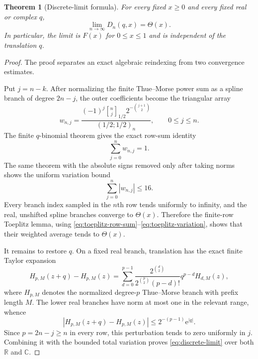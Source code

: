 \documentclass[11pt]{article}
\numberwithin{equation}{section}
\newtheorem{theorem}{Theorem}[section]
\theoremstyle{definition}
\theoremstyle{remark}
\newcommand{\R}{\mathbb{R}}
\newcommand{\C}{\mathbb{C}}
\newcommand{\e}{\mathrm{e}}
\newcommand{\Th}{\Theta}
\newcommand{\qbinom}[2]{\genfrac{[}{]}{0pt}{}{#1}{#2}_{1/2}}
\begin{document}
\begin{theorem}[Discrete-limit formula]
\label{thm:discrete-limit}
For every fixed $x\geq0$ and every fixed real or complex $q$,
\begin{equation}\label{eq:discrete-limit}
 \lim_{n\to\infty}D_n(q,x)=\Th(x).
\end{equation}
In particular, the limit is $F(x)$ for $0\leq x\leq1$ and is independent of
the translation $q$.
\end{theorem}

\begin{proof}
The proof separates an exact algebraic reindexing from two convergence
estimates.

Put $j=n-k$.  After normalizing the finite Thue--Morse power sum as a spline
branch of degree $2n-j$, the outer coefficients become the triangular array
\begin{equation}\label{eq:toeplitz-weight}
 w_{n,j}=
 \frac{(-1)^j\qbinom{n}{j}
       2^{-\binom{j+1}{2}}}{(1/2;1/2)_n},
 \qquad 0\leq j\leq n.
\end{equation}
The finite $q$-binomial theorem gives the exact row-sum identity
\begin{equation}\label{eq:toeplitz-row-sum}
 \sum_{j=0}^{n}w_{n,j}=1.
\end{equation}
The same theorem with the absolute signs removed only after taking norms
shows the uniform variation bound
\begin{equation}\label{eq:toeplitz-variation}
 \sum_{j=0}^{n}|w_{n,j}|\leq16.
\end{equation}
Every branch index sampled in the $n$th row tends uniformly to infinity, and
the real, unshifted spline branches converge to $\Th(x)$.  Therefore the
finite-row Toeplitz lemma, using
\eqref{eq:toeplitz-row-sum}--\eqref{eq:toeplitz-variation}, shows that their
weighted average tends to $\Th(x)$.

It remains to restore $q$.  On a fixed real branch, translation has the exact
finite Taylor expansion
\begin{equation}\label{eq:spline-translation}
 H_{p,M}(z+q)-H_{p,M}(z)
 =\sum_{d=0}^{p-1}
 \frac{2^{\binom d2}}{2^{\binom p2}(p-d)!}
 q^{p-d}H_{d,M}(z),
\end{equation}
where $H_{p,M}$ denotes the normalized degree-$p$ Thue--Morse branch with
prefix length $M$.  The lower real branches have norm at most one in the
relevant range, whence
\begin{equation}\label{eq:spline-translation-bound}
 |H_{p,M}(z+q)-H_{p,M}(z)|
 \leq2^{-(p-1)}\e^{|q|}.
\end{equation}
Since $p=2n-j\geq n$ in every row, this perturbation tends to zero uniformly
in $j$.  Combining it with the bounded total variation proves
\eqref{eq:discrete-limit} over both $\R$ and $\C$.
\end{proof}
\end{document}
